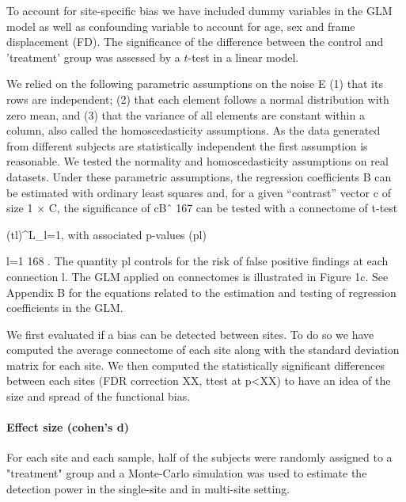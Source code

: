 \documentclass[authoryear]{elsarticle}
\begin{document}
To account for site-specific bias we have included dummy variables in the GLM model as well as confounding variable to account for age, sex and frame displacement (FD). The significance of the difference between the control and 'treatment' group was assessed by a $t$-test in a linear model.


We relied on the following parametric assumptions on the noise E (1) that its rows are independent; (2) that each element follows a normal distribution with zero mean, and (3) that the variance of all elements are constant within a column, also called the homoscedasticity assumptions. As the data generated from different subjects are statistically independent the first assumption is reasonable. We tested the normality and homoscedasticity assumptions on real datasets. Under these parametric assumptions, the regression coefficients B can be estimated with ordinary least squares and, for a given “contrast” vector c of size 1 × C, the significance of cBˆ 167 can be tested with a connectome of t-test

(tl)^{L}_{l=1}, with associated p-values (pl)



l=1 168 . The quantity pl controls for the risk of false positive findings at each connection l. The GLM applied on connectomes is illustrated in Figure 1c. See Appendix B for the equations related to the estimation and testing of regression coefficients in the GLM.



We first evaluated if a bias can be detected between sites. To do so we have computed the average connectome of each site along with the standard deviation matrix for each site. We then computed the statistically significant differences between each sites (FDR correction XX, ttest at p<XX) to have an idea of the size and spread of the functional bias.





\paragraph{Effect size (cohen's d)}
For each site and each sample, half of the subjects were randomly assigned to a "treatment" group and a Monte-Carlo simulation was used to estimate the detection power in the single-site and in multi-site setting.
\end{document}
